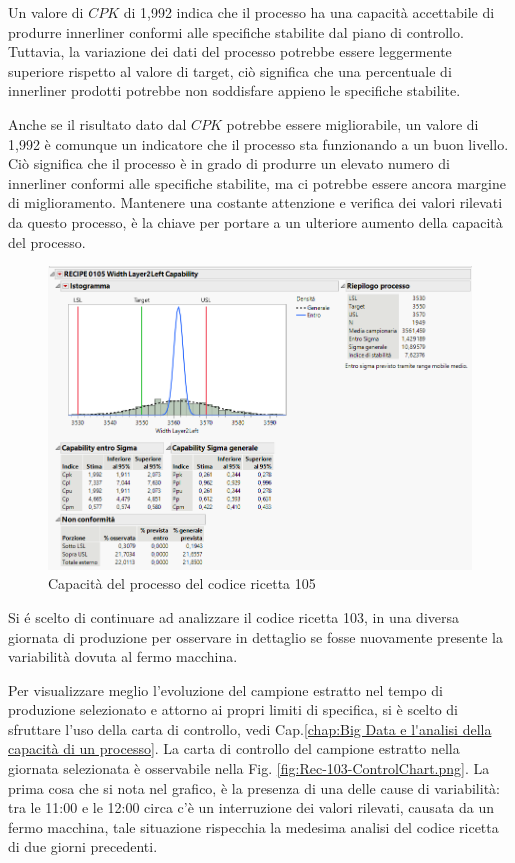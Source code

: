 Un valore di  $CPK$ di 1,992 indica che il processo ha una capacità accettabile di produrre innerliner conformi alle specifiche stabilite dal piano di controllo. 
Tuttavia, la variazione dei dati del processo potrebbe essere leggermente superiore rispetto al valore di target, ciò significa che una percentuale di innerliner prodotti potrebbe non soddisfare appieno le specifiche stabilite.

Anche se il risultato dato dal $CPK$ potrebbe essere migliorabile, un valore di 1,992 è comunque un indicatore che il processo sta funzionando a un buon livello. Ciò significa che il processo è in grado di produrre un elevato numero di innerliner conformi alle specifiche stabilite, ma ci potrebbe essere ancora margine di miglioramento. 
Mantenere una costante attenzione e verifica dei valori rilevati da questo processo, è la chiave per portare a un ulteriore aumento della capacità del processo.

\clearpage
\begin{figure}[h]
  \centering
  \includegraphics[width=1 \textwidth]{img/Rec105-Capability.png}
  \caption{Capacità del processo del codice ricetta 105 }
  \label{fig:Rec105-Capability.png}
\end{figure}


Si é scelto di continuare ad analizzare il codice ricetta 103, in una diversa giornata di produzione per osservare in dettaglio se fosse nuovamente presente la variabilità dovuta al fermo macchina.

Per visualizzare meglio l'evoluzione del campione estratto nel tempo di produzione selezionato e attorno ai propri limiti di specifica, si è scelto di sfruttare l'uso della carta di controllo, vedi Cap.\ref{chap:Big Data e l'analisi della capacità di un processo}. 
La carta di controllo del campione estratto nella giornata selezionata è osservabile nella Fig. \ref{fig:Rec-103-ControlChart.png}.
La prima cosa che si nota nel grafico, è la presenza di una delle cause di variabilità: tra le 11:00 e le 12:00 circa c'è un interruzione dei valori rilevati, causata da un fermo macchina, tale situazione rispecchia la medesima analisi del codice ricetta di due giorni precedenti.

